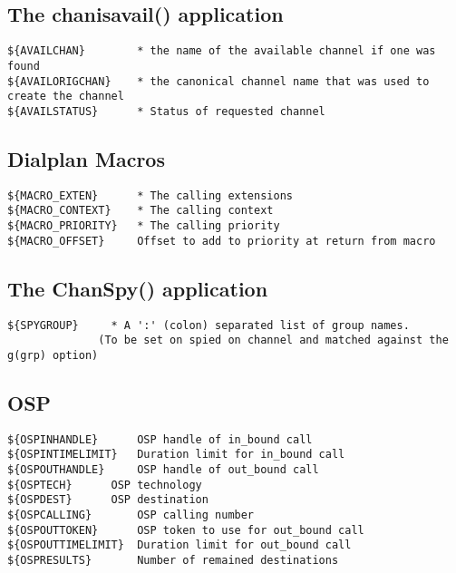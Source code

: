 \subsection{The chanisavail() application}
\begin{verbatim}
${AVAILCHAN}		* the name of the available channel if one was found	
${AVAILORIGCHAN} 	* the canonical channel name that was used to create the channel
${AVAILSTATUS}		* Status of requested channel
\end{verbatim}

\subsection{Dialplan Macros}
\begin{verbatim}
${MACRO_EXTEN}		* The calling extensions
${MACRO_CONTEXT}	* The calling context
${MACRO_PRIORITY}	* The calling priority
${MACRO_OFFSET}		Offset to add to priority at return from macro
\end{verbatim}

\subsection{The ChanSpy() application}
\begin{verbatim}
${SPYGROUP}		* A ':' (colon) separated list of group names.
			  (To be set on spied on channel and matched against the g(grp) option)
\end{verbatim}

\subsection{OSP}
\begin{verbatim}
${OSPINHANDLE}		OSP handle of in_bound call
${OSPINTIMELIMIT}	Duration limit for in_bound call
${OSPOUTHANDLE}		OSP handle of out_bound call
${OSPTECH}		OSP technology 
${OSPDEST}		OSP destination
${OSPCALLING}		OSP calling number
${OSPOUTTOKEN}		OSP token to use for out_bound call
${OSPOUTTIMELIMIT}	Duration limit for out_bound call
${OSPRESULTS}		Number of remained destinations
\end{verbatim}
